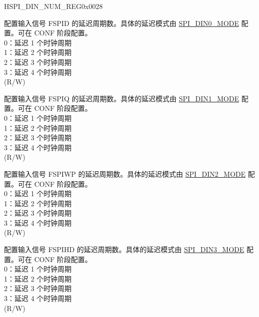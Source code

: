 \begin{register}{H}{SPI\_DIN\_NUM\_REG}{0x0028}\label{regdesc:SPIDINNUMREG}
%
%
%
%
%
\regnewline%
\begin{regdesc}\begin{reglist}
\label{fielddesc:SPIDIN0NUM}\item [SPI\_DIN0\_NUM] 配置输入信号 FSPID 的延迟周期数。具体的延迟模式由 \hyperref[fielddesc:SPIDIN0MODE]{SPI\_DIN0\_MODE} 配置。可在 CONF 阶段配置。 \\
0：延迟 1 个时钟周期 \\
1：延迟 2 个时钟周期 \\
2：延迟 3 个时钟周期 \\
3：延迟 4 个时钟周期 \\
(R/W)
\label{fielddesc:SPIDIN1NUM}\item [SPI\_DIN1\_NUM] 配置输入信号 FSPIQ 的延迟周期数。具体的延迟模式由 \hyperref[fielddesc:SPIDIN1MODE]{SPI\_DIN1\_MODE} 配置。可在 CONF 阶段配置。 \\
0：延迟 1 个时钟周期 \\
1：延迟 2 个时钟周期 \\
2：延迟 3 个时钟周期 \\
3：延迟 4 个时钟周期 \\
(R/W)
\label{fielddesc:SPIDIN2NUM}\item [SPI\_DIN2\_NUM] 配置输入信号 FSPIWP 的延迟周期数。具体的延迟模式由 \hyperref[fielddesc:SPIDIN2MODE]{SPI\_DIN2\_MODE} 配置。可在 CONF 阶段配置。 \\
0：延迟 1 个时钟周期 \\
1：延迟 2 个时钟周期 \\
2：延迟 3 个时钟周期 \\
3：延迟 4 个时钟周期 \\
(R/W)
\label{fielddesc:SPIDIN3NUM}\item [SPI\_DIN3\_NUM] 配置输入信号 FSPIHD 的延迟周期数。具体的延迟模式由 \hyperref[fielddesc:SPIDIN3MODE]{SPI\_DIN3\_MODE} 配置。可在 CONF 阶段配置。 \\
0：延迟 1 个时钟周期 \\
1：延迟 2 个时钟周期 \\
2：延迟 3 个时钟周期 \\
3：延迟 4 个时钟周期 \\
(R/W)
\end{reglist}\end{regdesc}
\end{register}


